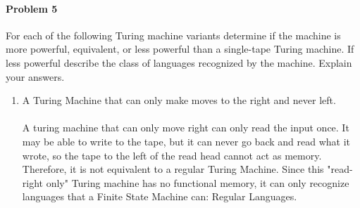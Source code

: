 \documentclass{article}
\begin{document}
    


\paragraph{Problem 5} For each of the following Turing machine variants determine if the machine
is more powerful, equivalent, or less powerful than a single-tape Turing machine. If less powerful
describe the class of languages recognized by the machine. Explain your answers.
\begin{enumerate}[\indent a)]
    \item A Turing Machine that can only make moves to the right and never left.
	\\\\A turing machine that can only move right can only read the input once. It may be able to write to the tape, but it can never go back and read what it wrote, so the tape to the left of the read head cannot act as memory. Therefore, it is not equivalent to a regular Turing Machine. Since this "read-right only" Turing machine has no functional memory, it can only recognize languages that a Finite State Machine can: Regular Languages.
    

\end{enumerate}
\end{document}
